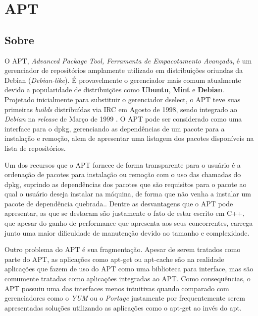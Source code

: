 \section*{APT} %
\label{sec:apt}

\subsection*{Sobre} %
\label{sub:sobre}


O {\code APT}, \textit{Advanced Package Tool, Ferramenta de Empacotamento Avançada}, é um gerenciador de repositórios  amplamente utilizado em distribuições oriundas da Debian (\textit{Debian-like}).
É provavelmente o gerenciador mais comum atualmente devido a popularidade de distribuições como \textbf{Ubuntu}, \textbf{Mint} e \textbf{Debian}.
Projetado inicialmente para substituir o gerenciador {\code dselect}, o APT teve suas primeiras \textit{builds} distribuídas via IRC em Agosto de 1998,  sendo integrado ao \textit{Debian} na \textit{release} de Março de 1999 \cite{garbee2008brief}. O  APT pode ser considerado como uma interface para o {\code dpkg}, gerenciando as dependências de um pacote para a instalação e remoção, alem de apresentar uma listagem dos pacotes disponíveis na lista de repositórios. 

Um dos recursos que o APT fornece de forma transparente para o usuário é a ordenação de pacotes para instalação ou remoção com o uso das chamadas do {\code dpkg}, suprindo as dependências dos pacotes que são requisitos para o pacote ao qual o usuário deseja instalar na máquina, de forma que não venha a instalar um pacote de dependência quebrada.. Dentre as desvantagens que o APT pode apresentar, as que se destacam são justamente o fato de estar escrito em C++, que apesar do ganho de performance que apresenta aos seus concorrentes, carrega junto uma maior dificuldade de manutenção devido ao tamanho e complexidade. 

Outro problema do APT é sua fragmentação. Apesar de serem tratados como parte do APT, as aplicações como {\code apt-get} ou {\code apt-cache} são na realidade aplicações que fazem de uso do APT como uma biblioteca para interface, mas são comumente tratadas como aplicações integradas ao APT. Como consequências, o APT possuiu uma das interfaces menos intuitivas quando comparado com gerenciadores como o \textit{YUM} ou o \textit{Portage} justamente por frequentemente serem apresentadas soluções utilizando as aplicações como o {\code apt-get} ao invés do {\code apt}.

